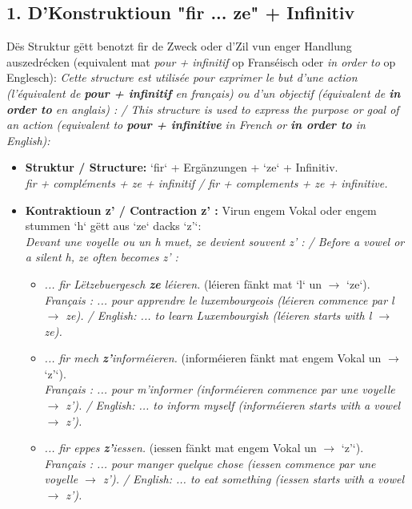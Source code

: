 \subsection*{1. D'Konstruktioun "fir ... ze" + Infinitiv}
Dës Struktur gëtt benotzt fir de Zweck oder d'Zil vun enger Handlung auszedrécken (equivalent mat \textit{pour + infinitif} op Franséisch oder \textit{in order to} op Englesch):
\textit{Cette structure est utilisée pour exprimer le but d'une action (l'équivalent de \textbf{pour + infinitif} en français) ou d'un objectif (équivalent de \textbf{in order to} en anglais) : / This structure is used to express the purpose or goal of an action (equivalent to \textbf{pour + infinitive} in French or \textbf{in order to} in English):}
\begin{itemize}
    \item \textbf{Struktur / Structure:} `fir` + Ergänzungen + `ze` + Infinitiv. \\
    \textit{fir + compléments + ze + infinitif / fir + complements + ze + infinitive.}
    \item \textbf{Kontraktioun z' / Contraction z' :} Virun engem Vokal oder engem stummen `h` gëtt aus `ze` dacks `z'`: \\
    \textit{Devant une voyelle ou un h muet, ze devient souvent z' : / Before a vowel or a silent h, ze often becomes z' :}
    \begin{itemize}
        \item \textit{... fir Lëtzebuergesch \textbf{ze} léieren.} (léieren fänkt mat `l` un $\rightarrow$ `ze`). \\
        \textit{Français : ... pour apprendre le luxembourgeois (léieren commence par l $\rightarrow$ ze). / English: ... to learn Luxembourgish (léieren starts with l $\rightarrow$ ze).}
        \item \textit{... fir mech \textbf{z'}informéieren.} (informéieren fänkt mat engem Vokal un $\rightarrow$ `z'`). \\
        \textit{Français : ... pour m'informer (informéieren commence par une voyelle $\rightarrow$ z'). / English: ... to inform myself (informéieren starts with a vowel $\rightarrow$ z').}
        \item \textit{... fir eppes \textbf{z'}iessen.} (iessen fänkt mat engem Vokal un $\rightarrow$ `z'`). \\
        \textit{Français : ... pour manger quelque chose (iessen commence par une voyelle $\rightarrow$ z'). / English: ... to eat something (iessen starts with a vowel $\rightarrow$ z').}

\end{itemize}
\end{itemize}
